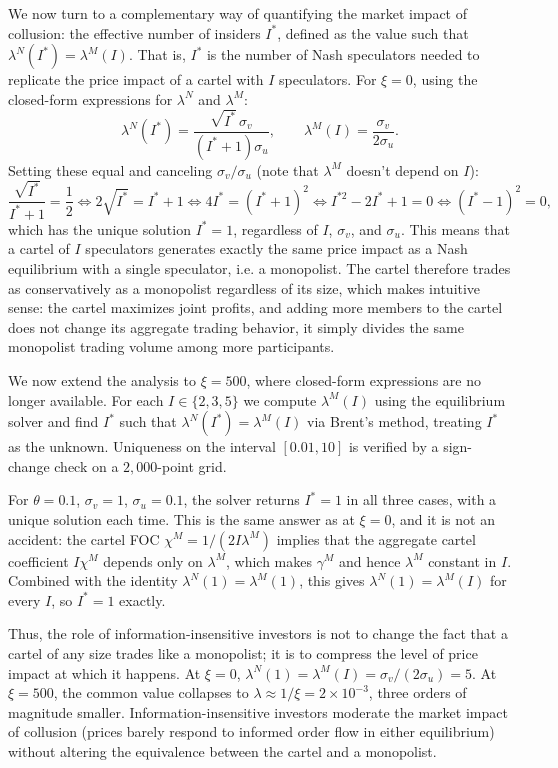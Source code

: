 \documentclass[11pt]{article}
\begin{document}
We now turn to a complementary way of quantifying the market impact of collusion: 
the effective number of insiders $I^*$, defined as the value such that 
$\lambda^N(I^*) = \lambda^M(I)$. That is, $I^*$ is the number of Nash speculators 
needed to replicate the price impact of a cartel with $I$ speculators. For $\xi=0$, 
using the closed-form expressions for $\lambda^N$ and $\lambda^M$:
\[
\lambda^N(I^*) = \frac{\sqrt{I^*}\,\sigma_v}{(I^*+1)\sigma_u}, \qquad 
\lambda^M(I) = \frac{\sigma_v}{2\sigma_u}.
\]
Setting these equal and canceling $\sigma_v/\sigma_u$ (note that $\lambda^M$ doesn't depend on $I$):
\[
\frac{\sqrt{I^*}}{I^*+1} = \frac{1}{2} \iff 2\sqrt{I^*} = I^*+1 \iff 
4I^* = (I^*+1)^2 \iff I^{*2} - 2I^* + 1 = 0 \iff (I^*-1)^2 = 0,
\]
which has the unique solution $I^*=1$, regardless of $I$, $\sigma_v$, and $\sigma_u$.
This means that a cartel of $I$ speculators generates exactly the same price impact 
as a Nash equilibrium with a single speculator, i.e. a monopolist. The cartel therefore 
trades as conservatively as a monopolist regardless of its size, which makes 
intuitive sense: the cartel maximizes joint profits, and adding more members to the cartel does not change its 
aggregate trading behavior, it simply divides the same monopolist trading volume among more participants.

We now extend the analysis to $\xi=500$, where closed-form expressions are no
longer available. For each $I \in \{2, 3, 5\}$ we compute $\lambda^M(I)$ using
the equilibrium solver and find $I^*$ such that $\lambda^N(I^*) = \lambda^M(I)$
via Brent's method, treating $I^*$ as the unknown. Uniqueness on the
interval $[0.01, 10]$ is verified by a sign-change check on a $2{,}000$-point
grid.

For $\theta=0.1$, $\sigma_v=1$, $\sigma_u=0.1$, the solver returns $I^* = 1$ in
all three cases, with a unique solution each time. This is the same answer as
at $\xi = 0$, and it is not an accident: the cartel FOC $\chi^M = 1/(2I\lambda^M)$
implies that the aggregate cartel coefficient $I\chi^M$ depends only on $\lambda^M$,
which makes $\gamma^M$ and hence $\lambda^M$ constant in $I$. Combined with the
identity $\lambda^N(1) = \lambda^M(1)$, this gives $\lambda^N(1) = \lambda^M(I)$ for every
$I$, so $I^* = 1$ exactly.

Thus, the role of information-insensitive investors is not to change the fact that a cartel of any size trades like a monopolist; it is to
compress the level of price impact at which it happens. At $\xi = 0$,
$\lambda^N(1) = \lambda^M(I) = \sigma_v/(2\sigma_u) = 5$. At $\xi = 500$, the
common value collapses to $\lambda \approx 1/\xi = 2 \times 10^{-3}$, three orders
of magnitude smaller. Information-insensitive investors moderate the market impact of collusion (prices barely respond to informed order flow
in either equilibrium) without altering the equivalence between the
cartel and a monopolist.
\end{document}
